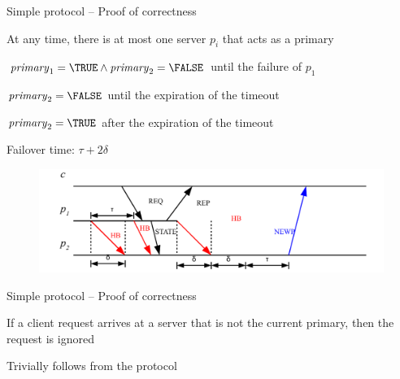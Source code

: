 \begin{frame}{Simple protocol -- Proof of correctness}
	
\BIL
\item[PB1] At any time, there is \alert{at most} one server $p_i$ that
  acts as a primary
\item[Proof]
\BI
\item $\isPrimary_1 = \TRUE \wedge \isPrimary_2 = \FALSE$ until the failure of $p_1$
\item $\isPrimary_2 = \FALSE$ until the expiration of the timeout
\item $\isPrimary_2 = \TRUE$ after the expiration of the timeout
\item Failover time: $\tau + 2\delta$
\EI
\EIL

\begin{figure}
	\includegraphics[width=1.0\textwidth]{figs/09/pb1}
\end{figure}

\end{frame}

\begin{frame}{Simple protocol -- Proof of correctness}
	
\BIL
\item[PB2] If a client request arrives at a server that is not the current primary, then the request is ignored
\item[Proof] Trivially follows from the protocol	
\EIL

\end{frame}

